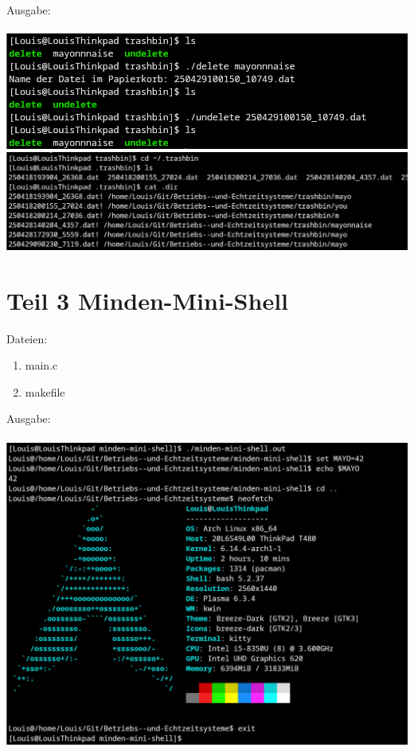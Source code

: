\documentclass[a4paper,10pt]{article}
\begin{document}
Ausgabe: \\ \\
\includegraphics[width=1\textwidth]{trashbin_ausgabe.png}
\includegraphics[width=1\textwidth]{trashbin_dir.png}

\section{Teil 3 Minden-Mini-Shell}
Dateien:
\begin{enumerate}
 \item main.c
 \item makefile
\end{enumerate}
Ausgabe: \\\\
\includegraphics[width=1\textwidth]{minden-mini-shell_ausgabe.png}
\end{document}
